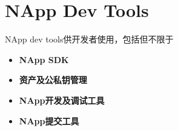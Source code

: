 \section{NApp Dev Tools}

NApp dev tools供开发者使用，包括但不限于
\begin{itemize}
\item \textbf{NApp SDK}
\item \textbf{资产及公私钥管理}
\item \textbf{NApp开发及调试工具}
\item \textbf{NApp提交工具}
\end{itemize}

